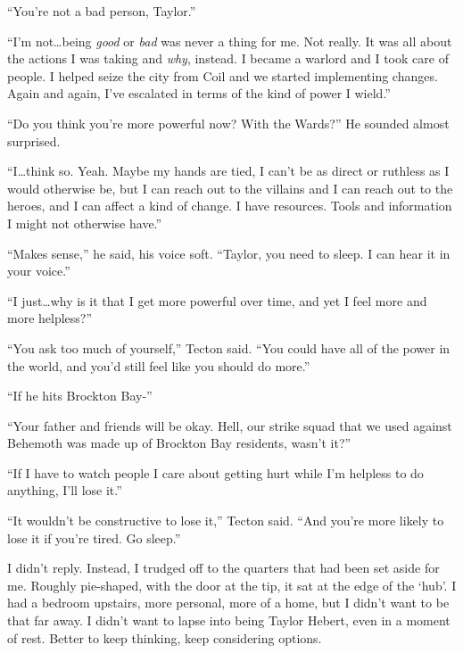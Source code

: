 ``You're not a bad person, Taylor.''



``I'm not\ldots being \emph{good} or \emph{bad} was never a thing for me.  Not really.  It was all about the actions I was taking and \emph{why}, instead.  I became a warlord and I took care of people.  I helped seize the city from Coil and we started implementing changes.  Again and again, I've escalated in terms of the kind of power I wield.''



``Do you think you're more powerful now?  With the Wards?''  He sounded almost surprised.



``I\ldots think so.  Yeah.  Maybe my hands are tied, I can't be as direct or ruthless as I would otherwise be, but I can reach out to the villains and I can reach out to the heroes, and I can affect a kind of change.  I have resources.  Tools and information I might not otherwise have.''



``Makes sense,'' he said, his voice soft.  ``Taylor, you need to sleep.  I can hear it in your voice.''



``I just\ldots why is it that I get more powerful over time, and yet I feel more and more helpless?''



``You ask too much of yourself,'' Tecton said.  ``You could have all of the power in the world, and you'd still feel like you should do more.''



``If he hits Brockton Bay-''



``Your father and friends will be okay.  Hell, our strike squad that we used against Behemoth was made up of Brockton Bay residents, wasn't it?''



``If I have to watch people I care about getting hurt while I'm helpless to do anything, I'll lose it.''



``It wouldn't be constructive to lose it,'' Tecton said.  ``And you're more likely to lose it if you're tired.  Go sleep.''



I didn't reply.  Instead, I trudged off to the quarters that had been set aside for me.  Roughly pie-shaped, with the door at the tip, it sat at the edge of the `hub'.  I had a bedroom upstairs, more personal, more of a home, but I didn't want to be that far away.  I didn't want to lapse into being Taylor Hebert, even in a moment of rest.  Better to keep thinking, keep considering options.



